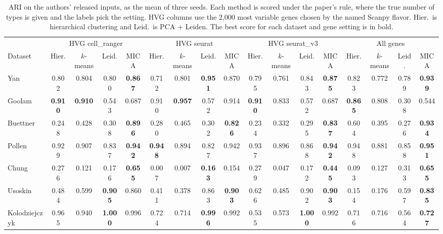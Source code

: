 \begin{table}[t]
\centering
\caption{ARI on the authors' released inputs, as the mean of three seeds. Each method is scored under the paper's rule, where the true number of types is given and the labels pick the setting. HVG columns use the 2,000 most variable genes chosen by the named Scanpy flavor. Hier.\ is hierarchical clustering and Leid.\ is PCA + Leiden. The best score for each dataset and gene setting is in bold.}
\label{tab:r2_author_data}
\scriptsize
\setlength{\tabcolsep}{2.5pt}
\begin{tabular}{lcccccccccccccccc}
\toprule
 & \multicolumn{4}{c}{HVG cell\_ranger} & \multicolumn{4}{c}{HVG seurat} & \multicolumn{4}{c}{HVG seurat\_v3} & \multicolumn{4}{c}{All genes} \\
\cmidrule(lr){2-5}\cmidrule(lr){6-9}\cmidrule(lr){10-13}\cmidrule(lr){14-17}
Dataset & Hier. & $k$-means & Leid. & MICA & Hier. & $k$-means & Leid. & MICA & Hier. & $k$-means & Leid. & MICA & Hier. & $k$-means & Leid. & MICA \\
\midrule
Yan & 0.802 & 0.804 & 0.800 & \textbf{0.867} & 0.712 & 0.801 & \textbf{0.951} & 0.870 & 0.795 & 0.761 & 0.843 & \textbf{0.875} & 0.823 & 0.772 & 0.789 & \textbf{0.939} \\
Goolam & \textbf{0.910} & \textbf{0.910} & 0.543 & 0.687 & 0.910 & \textbf{0.957} & 0.572 & 0.914 & \textbf{0.910} & 0.833 & 0.572 & 0.687 & \textbf{0.865} & 0.808 & 0.308 & 0.544 \\
Buettner & 0.248 & 0.428 & 0.308 & \textbf{0.896} & 0.280 & 0.465 & 0.302 & \textbf{0.826} & 0.234 & 0.332 & 0.295 & \textbf{0.837} & 0.604 & 0.395 & 0.276 & \textbf{0.934} \\
Pollen & 0.929 & 0.907 & 0.837 & \textbf{0.942} & \textbf{0.948} & 0.894 & 0.827 & 0.942 & 0.937 & 0.896 & 0.868 & \textbf{0.942} & 0.948 & 0.881 & 0.858 & \textbf{0.951} \\
Chung & 0.276 & 0.121 & 0.176 & \textbf{0.655} & 0.007 & 0.007 & \textbf{0.163} & 0.154 & 0.279 & 0.047 & 0.172 & \textbf{0.445} & 0.093 & 0.127 & 0.313 & \textbf{0.655} \\
Usoskin & 0.484 & 0.599 & \textbf{0.905} & 0.860 & 0.411 & 0.378 & 0.863 & \textbf{0.903} & 0.626 & 0.485 & 0.902 & \textbf{0.903} & 0.154 & 0.176 & 0.597 & \textbf{0.835} \\
Kolodziejczyk & 0.965 & 0.940 & \textbf{1.000} & 0.996 & 0.724 & 0.714 & \textbf{0.996} & 0.992 & 0.535 & 0.573 & \textbf{1.000} & 0.992 & 0.716 & 0.716 & 0.564 & \textbf{0.727} \\

\end{tabular}
\end{table}
